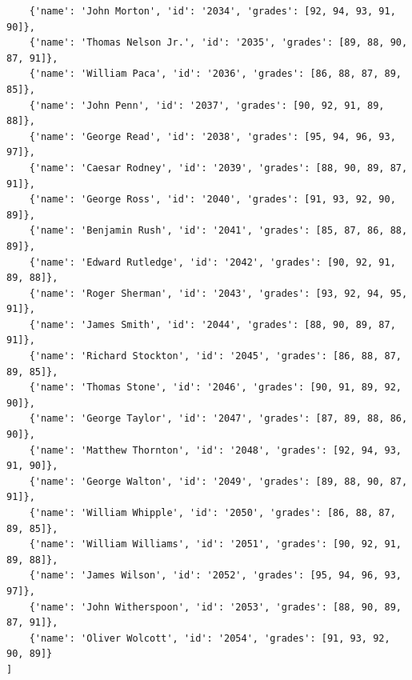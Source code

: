 \documentclass[12pt]{article}
\begin{document}
\begin{verbatim}
    {'name': 'John Morton', 'id': '2034', 'grades': [92, 94, 93, 91, 90]},
    {'name': 'Thomas Nelson Jr.', 'id': '2035', 'grades': [89, 88, 90, 87, 91]},
    {'name': 'William Paca', 'id': '2036', 'grades': [86, 88, 87, 89, 85]},
    {'name': 'John Penn', 'id': '2037', 'grades': [90, 92, 91, 89, 88]},
    {'name': 'George Read', 'id': '2038', 'grades': [95, 94, 96, 93, 97]},
    {'name': 'Caesar Rodney', 'id': '2039', 'grades': [88, 90, 89, 87, 91]},
    {'name': 'George Ross', 'id': '2040', 'grades': [91, 93, 92, 90, 89]},
    {'name': 'Benjamin Rush', 'id': '2041', 'grades': [85, 87, 86, 88, 89]},
    {'name': 'Edward Rutledge', 'id': '2042', 'grades': [90, 92, 91, 89, 88]},
    {'name': 'Roger Sherman', 'id': '2043', 'grades': [93, 92, 94, 95, 91]},
    {'name': 'James Smith', 'id': '2044', 'grades': [88, 90, 89, 87, 91]},
    {'name': 'Richard Stockton', 'id': '2045', 'grades': [86, 88, 87, 89, 85]},
    {'name': 'Thomas Stone', 'id': '2046', 'grades': [90, 91, 89, 92, 90]},
    {'name': 'George Taylor', 'id': '2047', 'grades': [87, 89, 88, 86, 90]},
    {'name': 'Matthew Thornton', 'id': '2048', 'grades': [92, 94, 93, 91, 90]},
    {'name': 'George Walton', 'id': '2049', 'grades': [89, 88, 90, 87, 91]},
    {'name': 'William Whipple', 'id': '2050', 'grades': [86, 88, 87, 89, 85]},
    {'name': 'William Williams', 'id': '2051', 'grades': [90, 92, 91, 89, 88]},
    {'name': 'James Wilson', 'id': '2052', 'grades': [95, 94, 96, 93, 97]},
    {'name': 'John Witherspoon', 'id': '2053', 'grades': [88, 90, 89, 87, 91]},
    {'name': 'Oliver Wolcott', 'id': '2054', 'grades': [91, 93, 92, 90, 89]}
]
\end{verbatim}
\end{document}
